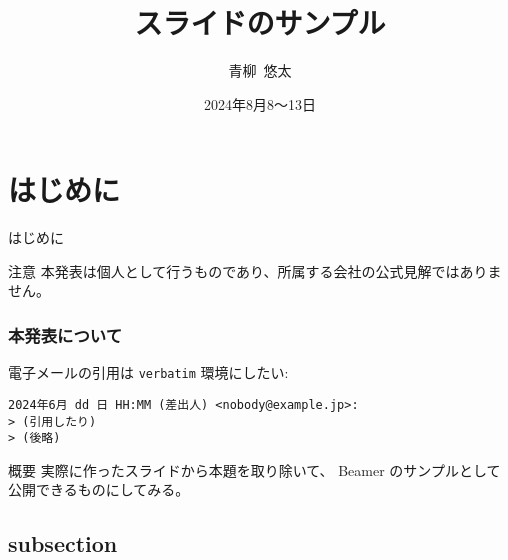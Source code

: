 
\title{スライドの\mbox{サンプル}} %

\author{青柳\ 悠太}


\date{2024年8月8～13日}



\begin{frame}
  \titlepage
\end{frame}

\begin{frame}
  \tableofcontents
\end{frame}

\section{はじめに}

\begin{frame}{はじめに}
  \begin{alertblock}{注意}
    本発表は個人として行うものであり、所属する会社の公式見解ではありません。
  \end{alertblock}
\end{frame}

\begin{frame}[fragile]
  \frametitle{本発表について}

  電子メールの引用は \texttt{verbatim} 環境にしたい:
\begin{verbatim}
2024年6月 dd 日 HH:MM (差出人) <nobody@example.jp>:
> (引用したり)
> (後略)
\end{verbatim}
  \pause

  \bigskip
  \begin{block}{概要}
    実際に作ったスライドから本題を取り除いて、 Beamer のサンプルとして公開できるものにしてみる。
  \end{block}
\end{frame}

\subsection{subsection}


